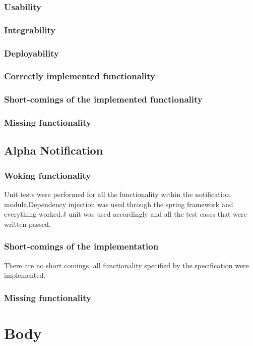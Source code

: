 \documentclass{article}
\begin{document}
        \subsubsection{Usability}
        \subsubsection{Integrability}
        \subsubsection{Deployability}
        \subsubsection{Correctly implemented functionality}
        \subsubsection{Short-comings of the implemented functionality}
        \subsubsection{Missing functionality}
\newpage
\subsection{Alpha Notification}
\subsubsection{Woking functionality}
	Unit tests were performed for all the functionality within the notification module.Dependency injection was used through the spring framework and everything worked.J unit was used accordingly and all the test cases that were written passed.
	
\subsubsection{Short-comings of the implementation}
	There are no short comings, all functionality specified by the specification were implemented.
\subsubsection{Missing functionality} 
	
\section{Body}
\lipsum[1]
\end{document}
